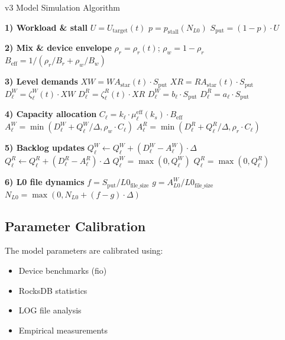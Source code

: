 \documentclass[11pt]{article}
\begin{document}
\begin{algorithm}[H]
\caption{v3 Model Simulation Algorithm}
\begin{algorithmic}[1]
\FOR{$t \in [0, T)$ step $\Delta$}
    \STATE \textbf{1) Workload \& stall}
    \STATE $U = U_{\text{target}}(t)$
    \STATE $p = p_{\text{stall}}(N_{L0})$
    \STATE $S_{\text{put}} = (1 - p) \cdot U$
    
    \STATE \textbf{2) Mix \& device envelope}
    \STATE $\rho_r = \rho_r(t)$; $\rho_w = 1 - \rho_r$
    \STATE $B_{\text{eff}} = 1 / (\rho_r/B_r + \rho_w/B_w)$
    
    \STATE \textbf{3) Level demands}
        \STATE $XW = WA_{\text{star}}(t) \cdot S_{\text{put}}$
        \STATE $XR = RA_{\text{star}}(t) \cdot S_{\text{put}}$
        \STATE $D^W_\ell = \zeta^W_\ell(t) \cdot XW$
        \STATE $D^R_\ell = \zeta^R_\ell(t) \cdot XR$
    \ELSE
        \STATE $D^W_\ell = b_\ell \cdot S_{\text{put}}$
        \STATE $D^R_\ell = a_\ell \cdot S_{\text{put}}$
    \ENDIF
    
    \STATE \textbf{4) Capacity allocation}
    \STATE $C_\ell = k_\ell \cdot \mu_\ell^{\text{eff}}(k_s) \cdot B_{\text{eff}}$
    \STATE $A^W_\ell = \min(D^W_\ell + Q^W_\ell/\Delta, \rho_w \cdot C_\ell)$
    \STATE $A^R_\ell = \min(D^R_\ell + Q^R_\ell/\Delta, \rho_r \cdot C_\ell)$
    
    \STATE \textbf{5) Backlog updates}
    \STATE $Q^W_\ell \leftarrow Q^W_\ell + (D^W_\ell - A^W_\ell) \cdot \Delta$
    \STATE $Q^R_\ell \leftarrow Q^R_\ell + (D^R_\ell - A^R_\ell) \cdot \Delta$
    \STATE $Q^W_\ell = \max(0, Q^W_\ell)$
    \STATE $Q^R_\ell = \max(0, Q^R_\ell)$
    
    \STATE \textbf{6) L0 file dynamics}
    \STATE $f = S_{\text{put}} / L0_{\text{file\_size}}$
    \STATE $g = A^W_{L0} / L0_{\text{file\_size}}$
    \STATE $N_{L0} = \max(0, N_{L0} + (f - g) \cdot \Delta)$
\ENDFOR
\end{algorithmic}
\end{algorithm}

\subsection{Parameter Calibration}

The model parameters are calibrated using:
\begin{itemize}
    \item Device benchmarks (fio)
    \item RocksDB statistics
    \item LOG file analysis
    \item Empirical measurements
\end{itemize}
\end{document}
